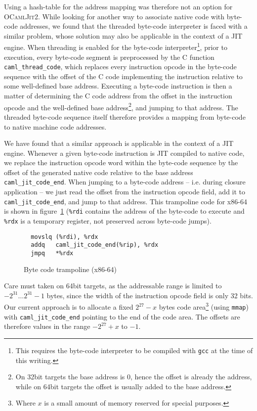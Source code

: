 \documentclass[a4paper]{acm_proc_article-sp}
\begin{document}
Using a hash-table for the address mapping was therefore not an option for \textsc{OCamlJit2}. While
looking for another way to associate native code with byte-code addresses, we found that the threaded
byte-code interpreter is faced with a similar problem, whose solution may also be applicable in the
context of a JIT engine. When threading is enabled for the byte-code interpreter\footnote{This requires
the byte-code interpreter to be compiled with \texttt{gcc} at the time of this writing.}, prior to
execution, every byte-code segment is preprocessed by the C function \texttt{caml\_thread\_code},
which replaces every instruction opcode in the byte-code sequence with the offset of the C code
implementing the instruction relative to some well-defined base address. Executing a byte-code
instruction is then a matter of determining the C code address from the offset in the instruction
opcode and the well-defined base address\footnote{On 32bit targets the base address is $0$, hence the
offset is already the address, while on 64bit targets the offset is usually added to the base address.},
and jumping to that address. The threaded byte-code sequence itself therefore provides a mapping
from byte-code to native machine code addresses.

We have found that a similar approach is applicable in the context of a JIT engine. Whenever a
given byte-code instruction is JIT compiled to native code, we replace the instruction opcode word
within the byte-code sequence by the offset of the generated native code relative to the base address
\texttt{caml\_jit\_code\_end}. When jumping to a byte-code address -- i.e. during closure application -- we
just read the offset from the instruction opcode field, add it to \linebreak[4]\texttt{caml\_jit\_code\_end},
and jump to that address. This trampoline code for x86-64 is shown in figure~\ref{figure:Byte_code_trampoline_x86_64}
(\texttt{\%rdi} contains the address of the byte-code to execute and \texttt{\%rdx} is a temporary
register, not preserved across byte-code jumps).

\begin{figure}[ht]
  \centering
  \begin{verbatim}
  movslq (%rdi), %rdx
  addq   caml_jit_code_end(%rip), %rdx
  jmpq   *%rdx
\end{verbatim}
  \caption{Byte code trampoline (x86-64)}
  \label{figure:Byte_code_trampoline_x86_64}
\end{figure}

Care must taken on 64bit targets, as the addressable range is limited to $-2^{31} \ldots 2^{31}-1$ bytes,
since the width of the instruction opcode field is only 32 bits. Our current approach is to allocate
a fixed $2^{27}-x$ bytes code area\footnote{Where $x$ is a small amount of memory reserved for special purposes.}
(using \texttt{mmap}) with \texttt{caml\_jit\_code\_end} pointing to the end of the code area.
The offsets are therefore values in the range $-2^{27}+x$ to $-1$.
\end{document}
